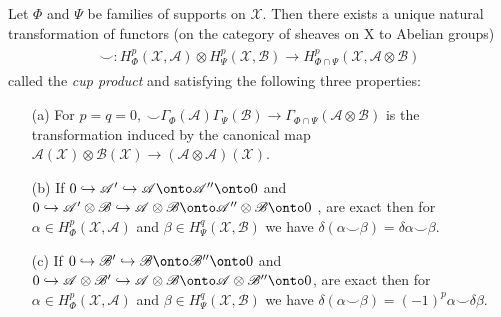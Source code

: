 \documentclass{beamer}
\theoremstyle{plain}
\newcommand{\bean}{\begin{eqnarray*}}
\newcommand{\eean}{\end{eqnarray*}}
\newcommand{\Ga}{\Gamma}
\newcommand{\dl}{\delta}
\newcommand{\sX}{\mathcal{X}}       %
\renewcommand{\a}{\alpha}
\newcommand{\bt}{\beta}           %
\newcommand{\hookto}{\hookrightarrow}        %
\begin{document}
\begin{frame}
	\begin{theorem}
	Let $\Phi$ and $\Psi$ be families of supports on $\sX$. Then there exists
	a unique natural transformation of functors (on the category of sheaves on
	X to Abelian groups)
	\bean\label{cup_p_eqn}
	\begin{split}
		\smile : H^p_\Phi\left(\sX, \mathscr A \right) \otimes  H^p_\Psi\left(\sX, \mathscr B \right)\to H^p_{\Phi\cap\Psi}\left(\sX, \mathscr A \otimes \mathscr B\right)
	\end{split}
	\eean
	called the {\it cup product} and satisfying the following three properties:
	\begin{enumerate}
		\item [(a)] For $p = q = 0, ~ \smile \Ga_\Phi\left( \mathscr A\right) \Ga_\Psi\left( \mathscr B\right)\to \Ga_{\Phi\cap \Psi}\left(\mathscr A \otimes \mathscr B \right)$  is the transformation
		induced by the canonical map $\mathscr A\left(\sX\right)\otimes \mathscr B\left(\sX\right)\to \left(\mathscr A \otimes \mathscr A \right)\left(\sX \right)$.   %
		\item [(b)] If $0 \hookto \mathscr A' \hookto \mathscr A \onto \mathscr A'' \onto 0$ and $0 \hookto \mathscr A' \otimes \mathscr B\hookto \mathscr A \otimes \mathscr B\onto \mathscr A'' \otimes \mathscr B \onto 0$  , are exact then for $\a \in H^p_\Phi\left(\sX, \mathscr A \right)$ and $\bt \in H^q_\Psi\left(\sX, \mathscr B \right)$ we have $\dl\left( \a \smile \bt\right)= \dl \a  \smile \bt$.
		\item [(c)] If $0 \hookto \mathscr B' \hookto \mathscr B \onto \mathscr B'' \onto 0$ and $0 \hookto \mathscr A \otimes\mathscr B' \hookto\mathscr A \otimes \mathscr B \onto \mathscr A \otimes\mathscr B'' \onto 0$, are exact then for $\a \in H^p_\Phi\left(\sX, \mathscr A \right)$ and $\bt \in H^q_\Psi\left(\sX, \mathscr B \right)$ we have $\dl\left( \a \smile \bt\right)= \left(-1 \right)^p  \a  \smile \dl\bt$.
		
	\end{enumerate}
\end{theorem}
	
\end{frame}
\end{document}
